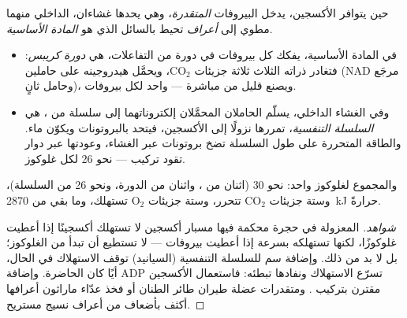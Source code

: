 \begin{proposition}\label{prop:g12:respiration-fermentation:mitochondrion}
حين يتوافر الأكسجين، يدخل البيروفات \emph{المتقدرة}،
وهي  يحدها غشاءان، الداخلي منهما مطوي إلى \emph{أعراف} تحيط
بالسائل الذي هو \emph{المادة الأساسية}.
\begin{itemize}
  \item في المادة الأساسية، يفكك كل بيروفات في دورة من التفاعلات، هي
        \emph{دورة كريبس}: فتغادر ذراته الثلاث ثلاثة
        جزيئات $\mathrm{CO_2}$، ويحمَّل هيدروجينه على حاملين (NAD مرجَع
        وحامل ثانٍ)، ويصنع قليل من  مباشرة --- واحد لكل بيروفات.
  \item وفي الغشاء الداخلي، يسلّم الحاملان المحمَّلان إلكتروناتهما إلى
        سلسلة من ، هي \emph{السلسلة التنفسية}، تمررها نزولًا
        إلى الأكسجين، فيتحد بالبروتونات ويكوّن ماء. والطاقة المتحررة
        على طول السلسلة تضخ بروتونات عبر الغشاء، وعودتها عبر 
        دوار تقود تركيب  --- نحو 26 لكل غلوكوز.
\end{itemize}
والمجموع لغلوكوز واحد: نحو 30  (اثنان من ، واثنان من
الدورة، ونحو 26 من السلسلة)، وستة جزيئات $\mathrm{CO_2}$ تتحرر، وستة
جزيئات $\mathrm{O_2}$ تستهلك، وما بقي من \qty{2870}{kJ} حرارةً.
\end{proposition}
\begin{proof}[شواهد]
 المعزولة في حجرة محكمة فيها مسبار أكسجين لا تستهلك أكسجينًا
إذا أعطيت غلوكوزًا، لكنها تستهلكه بسرعة إذا أعطيت بيروفات --- 
لا تستطيع أن تبدأ من الغلوكوز؛ بل لا بد  من ذلك. وإضافة سم
للسلسلة التنفسية (السيانيد) توقف الاستهلاك في الحال، أيًا كان 
الحاضرة. وإضافة ADP تسرّع الاستهلاك ونفادها تبطئه: فاستعمال الأكسجين
مقترن بتركيب . ومتقدرات عضلة طيران طائر الطنان أو فخذ عدّاء ماراثون
أعرافها أكثف بأضعاف من أعراف نسيج مستريح.
\end{proof}


